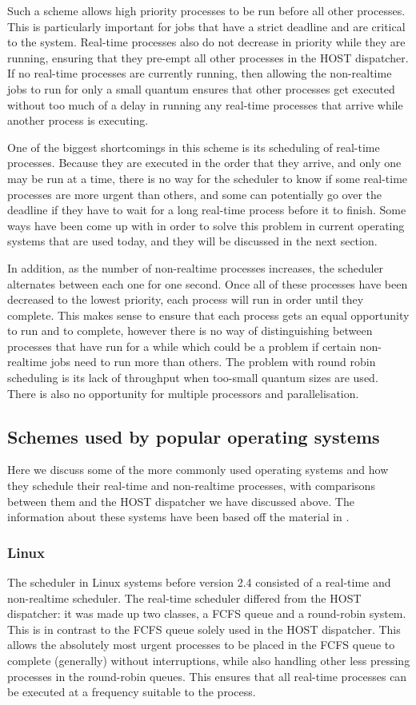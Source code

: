 \documentclass[12pt]{article}
\begin{document}
Such a scheme allows high priority processes to be run before all other
processes. This is particularly important for jobs that have a strict deadline
and are critical to the system. Real-time processes also do not decrease in
priority while they are running, ensuring that they pre-empt all other
processes in the HOST dispatcher. If no real-time processes are currently
running, then allowing the non-realtime jobs to run for only a small quantum
ensures that other processes get executed without too much of a delay in
running any real-time processes that arrive while another process is executing.

One of the biggest shortcomings in this scheme is its scheduling of real-time
processes. Because they are executed in the order that they arrive, and only
one may be run at a time, there is no way for the scheduler to know if some
real-time processes are more urgent than others, and some can potentially
go over the deadline if they have to wait for a long real-time process before
it to finish. Some ways have been come up with in order to solve this problem
in current operating systems that are used today, and they will be discussed in
the next section.

In addition, as the number of non-realtime processes increases, the scheduler
alternates between each one for one second. Once all of these processes have
been decreased to the lowest priority, each process will run in order until
they complete. This makes sense to ensure that each process gets an equal
opportunity to run and to complete, however there is no way of distinguishing
between processes that have run for a while which could be a problem if certain
non-realtime jobs need to run more than others. The problem with round robin
scheduling is its lack of throughput when too-small quantum sizes are used.
There is also no opportunity for multiple processors and parallelisation.

\subsection{Schemes used by popular operating systems}
Here we discuss some of the more commonly used operating systems and how they
schedule their real-time and non-realtime processes, with comparisons between
them and the HOST dispatcher we have discussed above. The information about
these systems have been based off the material in \cite{stallings:2012}.

\subsubsection{Linux}
The scheduler in Linux systems before version 2.4 consisted of a real-time
and non-realtime scheduler. The real-time scheduler differed from the HOST
dispatcher: it was made up two classes, a FCFS queue and a round-robin system.
This is in contrast to the FCFS queue solely used in the HOST dispatcher. This
allows the absolutely most urgent processes to be placed in the FCFS queue to
complete (generally) without interruptions, while also handling other less
pressing processes in the round-robin queues. This ensures that all real-time
processes can be executed at a frequency suitable to the process.
\end{document}
